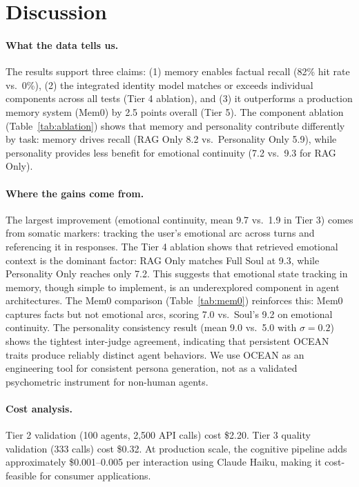 \documentclass{article}
\begin{document}
\section{Discussion}
\label{sec:discussion}

\paragraph{What the data tells us.}
The results support three claims: (1) memory enables factual recall (82\% hit rate vs.\ 0\%), (2) the integrated identity model matches or exceeds individual components across all tests (Tier 4 ablation), and (3) it outperforms a production memory system (Mem0) by 2.5 points overall (Tier 5). The component ablation (Table~\ref{tab:ablation}) shows that memory and personality contribute differently by task: memory drives recall (RAG Only 8.2 vs.\ Personality Only 5.9), while personality provides less benefit for emotional continuity (7.2 vs.\ 9.3 for RAG Only).

\paragraph{Where the gains come from.}
The largest improvement (emotional continuity, mean 9.7 vs.\ 1.9 in Tier 3) comes from somatic markers: tracking the user's emotional arc across turns and referencing it in responses. The Tier 4 ablation shows that retrieved emotional context is the dominant factor: RAG Only matches Full Soul at 9.3, while Personality Only reaches only 7.2. This suggests that emotional state tracking in memory, though simple to implement, is an underexplored component in agent architectures. The Mem0 comparison (Table~\ref{tab:mem0}) reinforces this: Mem0 captures facts but not emotional arcs, scoring 7.0 vs.\ Soul's 9.2 on emotional continuity. The personality consistency result (mean 9.0 vs.\ 5.0 with $\sigma = 0.2$) shows the tightest inter-judge agreement, indicating that persistent OCEAN traits produce reliably distinct agent behaviors. We use OCEAN as an engineering tool for consistent persona generation, not as a validated psychometric instrument for non-human agents.

\paragraph{Cost analysis.}
Tier 2 validation (100 agents, 2,500 API calls) cost \$2.20. Tier 3 quality validation (333 calls) cost \$0.32. At production scale, the cognitive pipeline adds approximately \$0.001--0.005 per interaction using Claude Haiku, making it cost-feasible for consumer applications.
\end{document}
